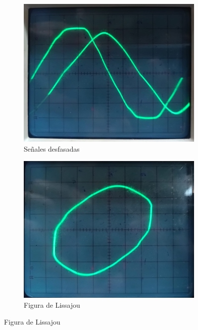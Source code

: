 \begin{figure}[H]
    \begin{subfigure}{0.45\textwidth}
        \centering
        \includegraphics[width=1\linewidth]{Imagenes/Mediciones/desfExp1.jpeg}
        \caption{Señales desfasadas}
        \label{fig:desfExp1}
    \end{subfigure}
    \hspace*{\fill}
    \begin{subfigure}{0.45\textwidth}
        \centering
        \includegraphics[width=1\linewidth]{Imagenes/Mediciones/lissajou.jpeg}
        \caption{Figura de Lissajou}
        \label{fig:corrFp}
    \end{subfigure}
\end{figure}

